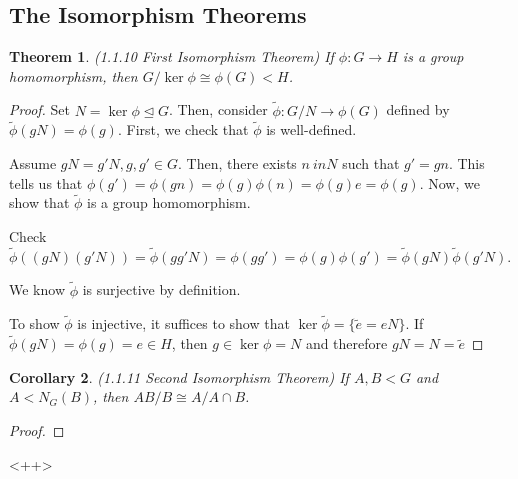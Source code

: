 \documentclass[11pt,leqno,oneside]{amsart}
\newcommand{\subgroup}{\mathrel{<}}
\newcommand{\normsubgroup}{\mathrel{\unlhd}}
\newtheorem{thm}{Theorem}[section]
\newtheorem{cor}[thm]{Corollary}
\theoremstyle{definition}
\numberwithin{equation}{section}
\begin{document}
\subsection{The Isomorphism Theorems}
\begin{thm}
    (1.1.10 First Isomorphism Theorem) If $\phi: G \to H$ is a group homomorphism, then $G/\ker \phi \cong \phi(G) \subgroup H$.
\end{thm}
\begin{proof}
    Set $N = \ker \phi \normsubgroup G$. Then, consider $\widetilde{\phi}: G/N \to \phi(G)$ defined by $\widetilde{\phi}(gN) = \phi(g)$. First, we check that $\widetilde{\phi}$ is well-defined.

    Assume $gN = g'N, g,g' \in G$. Then, there exists $n \ in N$ such that $g' = gn$. This tells us that $\phi(g') = \phi(gn) = \phi(g)\phi(n) = \phi(g)e = \phi(g)$. Now, we show that $\widetilde{\phi}$ is a group homomorphism.

    Check $\widetilde{\phi}( (gN)(g'N) ) = \widetilde{\phi}(gg'N) = \phi(gg') = \phi(g)\phi(g') = \widetilde{\phi}(gN) \widetilde{\phi}(g'N)$.

    We know $\widetilde{\phi}$ is surjective by definition. 

    To show $\widetilde{\phi}$ is injective, it suffices to show that $\ker \widetilde{\phi} = \{\widetilde{e} = eN\}$. If $\widetilde{\phi}(gN) = \phi(g) = e \in H$, then $g \in \ker \phi = N$ and therefore $gN = N = \widetilde{e}$
\end{proof}
\begin{cor}
    (1.1.11 Second Isomorphism Theorem) If $A,B \subgroup G$ and $A \subgroup N_G(B)$, then $AB/B \cong A/A\cap B$.
\end{cor}
\begin{proof}

\end{proof}<++>
\end{document}
